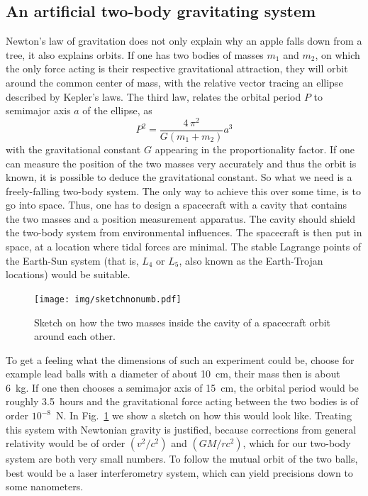 \documentclass[prb,preprint]{revtex4-1}
\begin{document}
\subsection{An artificial two-body gravitating system}
Newton's law of gravitation does not only explain why an apple falls
down from a tree, it also explains orbits. If one has two bodies of
masses $m_1$ and $m_2$, on which the only force acting is their
respective gravitational attraction, they will orbit around the common
center of mass, with the relative vector tracing an ellipse
described by Kepler's laws. The third law, relates the
orbital period $P$ to semimajor axis $a$ of the ellipse, as
\begin{equation}\label{eq:kepler3}
P^2 = \frac{4 \, \pi^2}{G(m_1+m_2)}a^3
\end{equation}
with the gravitational constant $G$ appearing in the proportionality
factor.  If one can measure the position of the two masses very
accurately and thus the orbit is known, it is possible to deduce the
gravitational constant.  So what we need is a freely-falling two-body
system. The only way to achieve this over some time, is to go into
space. Thus, one has to design a spacecraft with a cavity that
contains the two masses and a position measurement apparatus. The
cavity should shield the two-body system from environmental
influences. The spacecraft is then put in space, at a location where
tidal forces are minimal.  The stable Lagrange points of the Earth-Sun
system (that is, $L_4$ or $L_5$, also known as the Earth-Trojan
locations) would be suitable.

\begin{figure}
	\centering
	\texttt{[image: img/sketchnonumb.pdf]}
	\caption{Sketch on how the two masses inside the cavity of a spacecraft orbit around each other.}
	\label{fig:sketch}
\end{figure}

To get a feeling what the dimensions of such an experiment could be,
choose for example lead balls with a diameter of about 10~cm, their
mass then is about 6~kg. If one then chooses a semimajor axis of
15~cm, the orbital period would be roughly 3.5~hours and the
gravitational force acting between the two bodies is of order
$10^{-8}$~N.  In Fig.~\ref{fig:sketch} we show a sketch on how this
would look like. Treating this system with Newtonian gravity is justified, because corrections from general relativity would be of order $(v^2/c^2)$ and $(GM/rc^2)$, which for our two-body system are both very small numbers. To follow the mutual orbit of the two balls, best
would be a laser interferometry system, which can yield precisions
down to some nanometers.\cite{Loughridge13}
\end{document}
